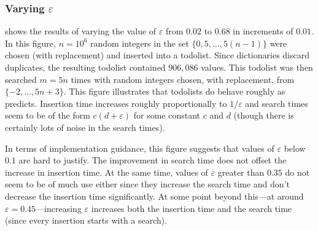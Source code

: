 \documentclass{patmorin}
\newcommand{\eps}{\varepsilon}
\begin{document}
\subsubsection{Varying $\eps$}

 shows the results of varying the value of $\eps$ from
$0.02$ to $0.68$ in increments of $0.01$. In this figure, $n=10^6$
random integers in the set $\{0, 5,\ldots,5(n-1)\}$ were chosen
(with replacement) and inserted into a todolist. Since dictionaries
discard duplicates, the resulting todolist contained $906,086$ values.
This todolist was then searched $m=5n$ times with random integers chosen,
with replacement, from $\{-2,\ldots,5n+3\}$.  This figure illustrates
that todolists do behave roughly as  predicts.
Insertion time increases roughly proportionally to $1/\eps$ and search
times seem to be of the form $c(d+\eps)$ for some constant $c$ and $d$
(though there is certainly lots of noise in the search times).

In terms of implementation guidance, this figure suggests that values
of $\eps$ below $0.1$ are hard to justify.  The improvement in search
time does not offset the increase in insertion time.  At the same
time, values of $\eps$ greater than $0.35$ do not seem to be of much
use either since they increase the search time and don't decrease the
insertion time significantly. At some point beyond this---at around
$\eps=0.45$---increasing $\eps$ increases both the insertion time and
the search time (since every insertion starts with a search).
\end{document}
